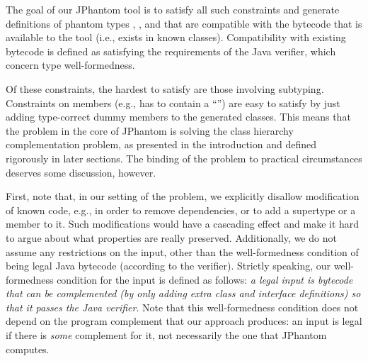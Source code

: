The goal of our JPhantom tool is to satisfy all such constraints and
generate definitions of phantom types , , and 
that are compatible with the bytecode that is available to the tool
(i.e., exists in known classes). Compatibility with existing bytecode
is defined as satisfying the requirements of the Java verifier, which
concern type well-formedness.

Of these constraints, the hardest to satisfy are those involving
subtyping.  Constraints on members (e.g.,  has to contain a
``'') are easy to satisfy by just adding type-correct
dummy members to the generated classes. This means that the problem in
the core of JPhantom is solving the class hierarchy complementation
problem, as presented in the introduction and defined rigorously in
later sections. The binding of the problem to practical circumstances
deserves some discussion, however.

First, note that, in our setting of the problem, we explicitly
disallow modification of known code, e.g., in order to remove
dependencies, or to add a supertype or a member to it. Such
modifications would have a cascading effect and make it hard to argue
about what properties are really preserved. Additionally, we do not
assume any restrictions on the input, other than the well-formedness
condition of being legal Java bytecode (according to the
verifier). Strictly speaking, our well-formedness condition for the
input is defined as follows: \emph{a legal input is bytecode that can
  be complemented (by only adding extra class and interface
  definitions) so that it passes the Java verifier}. Note that this
well-formedness condition does not depend on the program complement
that our approach produces: an input is legal if there is \emph{some}
complement for it, not necessarily the one that JPhantom computes.



